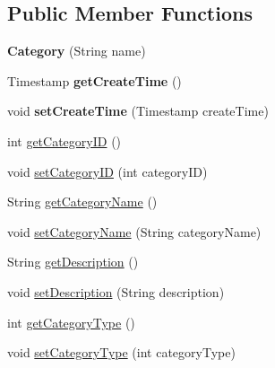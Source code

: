 \subsection*{Public Member Functions}
\begin{DoxyCompactItemize}
\item 
\hypertarget{classcom_1_1github_1_1walterfan_1_1gtd_1_1model_1_1Category_a18942b853a1d8bf504946faf3ba08a5f}{{\bfseries Category} (String name)}\label{classcom_1_1github_1_1walterfan_1_1gtd_1_1model_1_1Category_a18942b853a1d8bf504946faf3ba08a5f}

\item 
\hypertarget{classcom_1_1github_1_1walterfan_1_1gtd_1_1model_1_1Category_a59722c593f0f672d68403d4807c73770}{Timestamp {\bfseries get\-Create\-Time} ()}\label{classcom_1_1github_1_1walterfan_1_1gtd_1_1model_1_1Category_a59722c593f0f672d68403d4807c73770}

\item 
\hypertarget{classcom_1_1github_1_1walterfan_1_1gtd_1_1model_1_1Category_a1cf4ad1a01734d72c48db8c19c9dbfa8}{void {\bfseries set\-Create\-Time} (Timestamp create\-Time)}\label{classcom_1_1github_1_1walterfan_1_1gtd_1_1model_1_1Category_a1cf4ad1a01734d72c48db8c19c9dbfa8}

\item 
int \hyperlink{classcom_1_1github_1_1walterfan_1_1gtd_1_1model_1_1Category_a8adbad441ee1eea37b2267c353a5dfee}{get\-Category\-I\-D} ()
\item 
void \hyperlink{classcom_1_1github_1_1walterfan_1_1gtd_1_1model_1_1Category_ae78e859ccb6928ac32efc3bd8e579a6c}{set\-Category\-I\-D} (int category\-I\-D)
\item 
String \hyperlink{classcom_1_1github_1_1walterfan_1_1gtd_1_1model_1_1Category_a015800eca4b86c7690ab1a49d31bc535}{get\-Category\-Name} ()
\item 
void \hyperlink{classcom_1_1github_1_1walterfan_1_1gtd_1_1model_1_1Category_a0b8da744bbf9242d26dec0de34aa0b51}{set\-Category\-Name} (String category\-Name)
\item 
String \hyperlink{classcom_1_1github_1_1walterfan_1_1gtd_1_1model_1_1Category_aa7fe1ebaf93a008f2631587b46271c80}{get\-Description} ()
\item 
void \hyperlink{classcom_1_1github_1_1walterfan_1_1gtd_1_1model_1_1Category_a022af1bf07d31d0234414456999cd7bf}{set\-Description} (String description)
\item 
int \hyperlink{classcom_1_1github_1_1walterfan_1_1gtd_1_1model_1_1Category_a286803b58064b17d53303362a15e6bc2}{get\-Category\-Type} ()
\item 
void \hyperlink{classcom_1_1github_1_1walterfan_1_1gtd_1_1model_1_1Category_a35cdbb1267d1703506754c47d60eb8a1}{set\-Category\-Type} (int category\-Type)
\end{DoxyCompactItemize}
